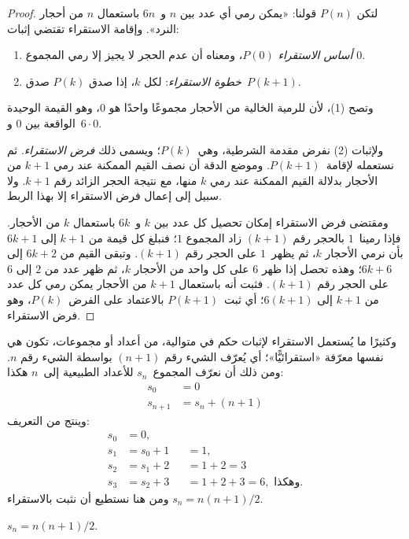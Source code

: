 \documentclass[../../../include/open-logic-section]{subfiles}
\begin{document}
\begin{proof}
لتكن $P(n)$ قولنا: «يمكن رمي أي عدد بين $n$ و~$6n$ باستعمال $n$ من
أحجار النرد». وإقامة الاستقراء تقتضي إثبات:
\begin{enumerate}
\item \emph{أساس الاستقراء} $P(0)$، ومعناه أن عدم الحجر لا يجيز إلا
  رمي المجموع $0$.
\item \emph{خطوة الاستقراء}: لكل $k$، إذا صدق $P(k)$ صدق~$P(k+1)$.
\end{enumerate}

وتصح (1)، لأن للرمية الخالية من الأحجار مجموعًا واحدًا هو $0$، وهو
القيمة الوحيدة الواقعة بين $0$ و~$6\cdot0$.

ولإثبات (2) نفرض مقدمة الشرطية، وهي~$P(k)$؛ ويسمى ذلك
\emph{فرض الاستقراء}. ثم نستعمله لإقامة~$P(k+1)$. وموضع الدقة أن
نصف القيم الممكنة عند رمي $k+1$ من الأحجار بدلالة القيم الممكنة عند
رمي $k$ منها، مع نتيجة الحجر الزائد رقم $k+1$. ولا سبيل إلى إعمال
فرض الاستقراء إلا بهذا الربط.

ومقتضى فرض الاستقراء إمكان تحصيل كل عدد بين $k$ و~$6k$ باستعمال
$k$ من الأحجار. فإذا رمينا~$1$ بالحجر رقم $(k+1)$ زاد المجموع $1$؛
فنبلغ كل قيمة من $k+1$ إلى $6k+1$ بأن نرمي الأحجار $k$، ثم يظهر~$1$
على الحجر رقم $(k+1)$. وتبقى القيم من $6k+2$ إلى $6k+6$؛ وهذه تحصل
إذا ظهر $6$ على كل واحد من الأحجار $k$، ثم ظهر عدد من $2$ إلى $6$
على الحجر رقم $(k+1)$. فثبت أنه باستعمال $k+1$ من الأحجار يمكن رمي
كل عدد من $k+1$ إلى $6(k+1)$؛ أي ثبت~$P(k+1)$ بالاعتماد على
الفرض~$P(k)$، وهو فرض الاستقراء.
\end{proof}

وكثيرًا ما يُستعمل الاستقراء لإثبات حكم في متوالية، من أعداد أو
مجموعات، تكون هي نفسها معرّفة «استقرائيًّا»؛ أي يُعرّف الشيء رقم
$(n+1)$ بواسطة الشيء رقم $n$. ومن ذلك أن نعرّف المجموع~$s_n$ للأعداد
الطبيعية إلى~$n$ هكذا:
\begin{align*}
  s_0 & = 0\\
  s_{n+1} & = s_n + (n+1)
\end{align*}
وينتج من التعريف:
\begin{align*}
  s_0 & = 0,\\
  s_1 & = s_0 + 1 && = 1,\\
  s_2 & = s_1 + 2 && = 1 + 2 = 3\\
  s_3 & = s_2 + 3 && = 1 + 2 + 3 = 6, \text{ وهكذا.}
\end{align*}
ومن هنا نستطيع أن نثبت بالاستقراء $s_n = n(n+1)/2$.

\begin{prop}
  $s_n = n(n+1)/2$.
\end{prop}
\end{document}
